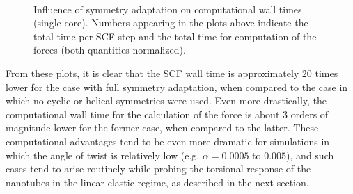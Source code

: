 \documentclass[preprint,12pt, 3p, sort&compress]{elsarticle}
\begin{document}
\begin{figure}[ht!]
\centering
{}\\
\caption{Influence of symmetry adaptation on computational wall times (single core). Numbers appearing in the plots above indicate the total time per SCF step and the total time for computation of the forces (both quantities normalized).}
\label{fig:symmetry_wall_times}
\end{figure}
From these plots, it is clear that the SCF wall time is approximately $20$ times lower for the case with full symmetry adaptation, when compared to the case in which no cyclic or helical symmetries were used. Even more drastically, the computational wall time for the calculation of the force is about 3 orders of magnitude lower for the former case, when compared to the latter.  These computational advantages tend to be even more dramatic for simulations in which the angle of twist is relatively low (e.g. $\alpha = 0.0005$ to $0.005$), and such cases tend to arise routinely while probing the torsional response of the nanotubes in the linear elastic regime, as described in the next section. 
\end{document}

